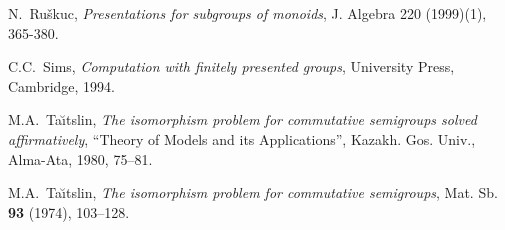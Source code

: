 \documentclass[12pt]{article}
\begin{document}
\begin{thebibliography}{9}
N.~Ru\v{s}kuc,
{\it Presentations for subgroups of monoids},
J. Algebra 220 (1999)(1), 365-380.

C.C.~Sims,
{\it Computation with finitely presented groups},
University Press, Cambridge, 1994.

M.A.~Ta\u{\i}tslin,
{\it The isomorphism problem for commutative 
semigroups solved affirmatively},
``Theory of Models and its Applications'', 
Kazakh. Gos. Univ., Alma-Ata, 1980, 75--81. 

M.A.~Ta\u{\i}tslin,
{\it The isomorphism problem for commutative semigroups},
Mat. Sb. {\bf 93} (1974), 103--128. 

\end{thebibliography}
\end{document}
